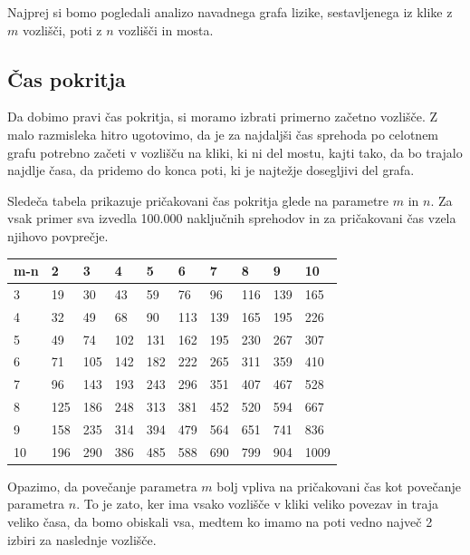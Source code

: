 \documentclass[12pt,a4paper]{amsart}
\begin{document}
Najprej si bomo pogledali analizo navadnega grafa lizike, sestavljenega iz klike z $m$ vozlišči, poti z $n$ vozlišči in
mosta.

\subsection{Čas pokritja}

Da dobimo pravi čas pokritja, si moramo izbrati primerno začetno vozlišče. Z malo razmisleka hitro ugotovimo, da je
za najdaljši čas sprehoda po celotnem grafu potrebno začeti v vozlišču na kliki, ki ni del mostu, kajti tako, da bo
trajalo najdlje časa, da pridemo do konca poti, ki je najtežje dosegljivi del grafa.

Sledeča tabela prikazuje pričakovani čas pokritja glede na parametre $m$ in $n$. Za vsak primer sva izvedla 100.000
naključnih sprehodov in za pričakovani čas vzela njihovo povprečje.

\begin{table}[!ht]
    \centering
    \begin{tabular}{|l|l|l|l|l|l|l|l|l|l|}
    \hline
        m-n & 2 & 3 & 4 & 5 & 6 & 7 & 8 & 9 & 10 \\ \hline
        3 & 19 & 30 & 43 & 59 & 76 & 96 & 116 & 139 & 165 \\ \hline
        4 & 32 & 49 & 68 & 90 & 113 & 139 & 165 & 195 & 226 \\ \hline
        5 & 49 & 74 & 102 & 131 & 162 & 195 & 230 & 267 & 307 \\ \hline
        6 & 71 & 105 & 142 & 182 & 222 & 265 & 311 & 359 & 410 \\ \hline
        7 & 96 & 143 & 193 & 243 & 296 & 351 & 407 & 467 & 528 \\ \hline
        8 & 125 & 186 & 248 & 313 & 381 & 452 & 520 & 594 & 667 \\ \hline
        9 & 158 & 235 & 314 & 394 & 479 & 564 & 651 & 741 & 836 \\ \hline
        10 & 196 & 290 & 386 & 485 & 588 & 690 & 799 & 904 & 1009 \\ \hline
    \end{tabular}
\end{table}

Opazimo, da povečanje parametra $m$ bolj vpliva na pričakovani čas kot povečanje parametra $n$. To je zato, ker 
ima vsako vozlišče v kliki veliko povezav in traja veliko časa, da bomo obiskali vsa, medtem ko imamo na poti vedno
največ 2 izbiri za naslednje vozlišče.
\end{document}
